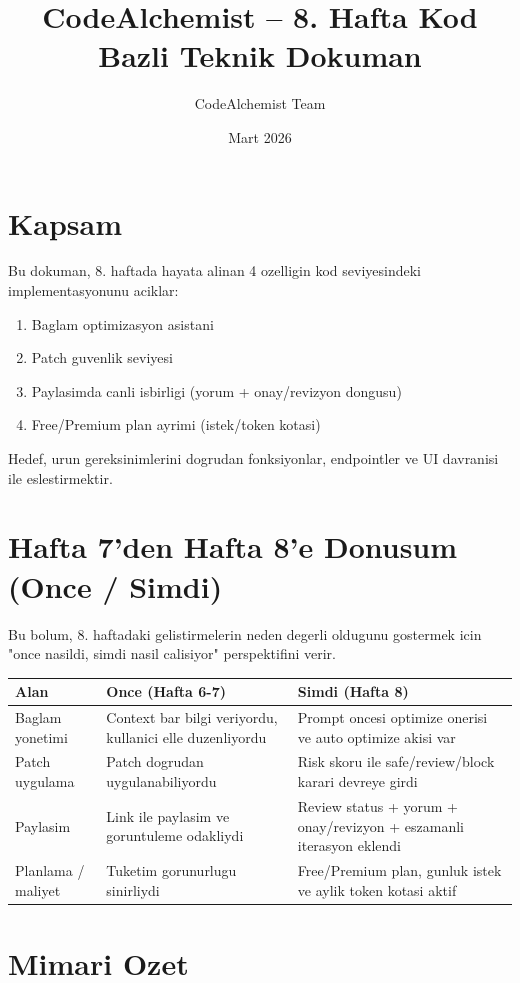 \documentclass[12pt,a4paper]{article}
\title{CodeAlchemist -- 8. Hafta Kod Bazli Teknik Dokuman}
\author{CodeAlchemist Team}
\date{Mart 2026}
\begin{document}
\maketitle
\tableofcontents
\newpage

\section{Kapsam}
Bu dokuman, 8. haftada hayata alinan 4 ozelligin kod seviyesindeki implementasyonunu aciklar:

\begin{enumerate}[leftmargin=*]
  \item Baglam optimizasyon asistani
  \item Patch guvenlik seviyesi
  \item Paylasimda canli isbirligi (yorum + onay/revizyon dongusu)
  \item Free/Premium plan ayrimi (istek/token kotasi)
\end{enumerate}

Hedef, urun gereksinimlerini dogrudan fonksiyonlar, endpointler ve UI davranisi ile eslestirmektir.

\section{Hafta 7'den Hafta 8'e Donusum (Once / Simdi)}
Bu bolum, 8. haftadaki gelistirmelerin neden degerli oldugunu gostermek icin
"once nasildi, simdi nasil calisiyor" perspektifini verir.

\begin{longtable}{@{} P{3.6cm} P{4.8cm} P{5.8cm} @{} }
\toprule
Alan & Once (Hafta 6-7) & Simdi (Hafta 8) \\
\midrule
Baglam yonetimi & Context bar bilgi veriyordu, kullanici elle duzenliyordu & Prompt oncesi optimize onerisi ve auto optimize akisi var \\
Patch uygulama & Patch dogrudan uygulanabiliyordu & Risk skoru ile safe/review/block karari devreye girdi \\
Paylasim & Link ile paylasim ve goruntuleme odakliydi & Review status + yorum + onay/revizyon + eszamanli iterasyon eklendi \\
Planlama / maliyet & Tuketim gorunurlugu sinirliydi & Free/Premium plan, gunluk istek ve aylik token kotasi aktif \\
\bottomrule
\end{longtable}

\section{Mimari Ozet}
\end{document}

